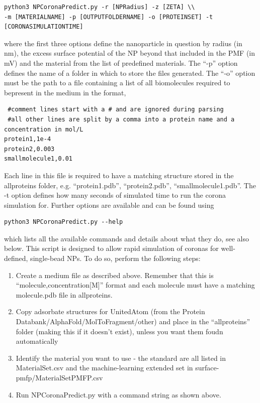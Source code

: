 \documentclass[10pt,a4paper,onecolumn]{report}
\begin{document}
\begin{lstlisting}
python3 NPCoronaPredict.py -r [NPRadius] -z [ZETA] \\
-m [MATERIALNAME] -p [OUTPUTFOLDERNAME] -o [PROTEINSET] -t [CORONASIMULATIONTIME]
\end{lstlisting}
 where the first three options define the nanoparticle in question by radius (in nm), the excess surface potential of the NP beyond that included in the PMF (in mV) and the material from the list of predefined materials. The ``-p'' option defines the name of a folder in which to store the files generated. The ``-o'' option must be the path to a file containing a list of all biomolecules required to bepresent in the medium in the format,
 \begin{lstlisting}
 #comment lines start with a # and are ignored during parsing
 #all other lines are split by a comma into a protein name and a concentration in mol/L
protein1,1e-4
protein2,0.003
smallmolecule1,0.01
\end{lstlisting}
Each line in this file is required to have a matching structure stored in the all\textunderscore proteins folder, e.g. ``protein1.pdb'', ``protein2.pdb'', ``smallmolecule1.pdb''. The -t option defines how many seconds of simulated time to run the corona simulation for. Further options are available and can be found using 
\begin{lstlisting}
python3 NPCoronaPredict.py --help
\end{lstlisting}
which lists all the available commands and details about what they do, see also below. This script is designed to allow rapid simulation of coronas for well-defined, single-bead NPs. To do so, perform the following steps:


\begin{enumerate}
\item Create a medium file as described above. Remember that this is ``molecule,concentration[M]'' format and each molecule must have a matching molecule.pdb file in all\textunderscore proteins.
\item Copy adsorbate structures for UnitedAtom (from the Protein Databank/AlphaFold/MolToFragment/other) and place in the ``all\textunderscore proteins'' folder (making this if it doesn't exist), unless you want them foudn automatically
\item Identify the material you want to use - the standard are all listed in MaterialSet.csv and the machine-learning extended set in surface-pmfp/MaterialSetPMFP.csv
\item Run NPCoronaPredict.py with a command string as shown above. 
\end{enumerate}
\end{document}
